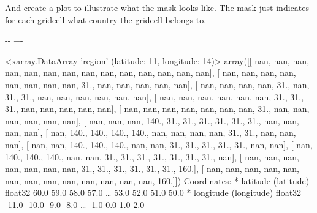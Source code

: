\documentclass[letterpaper,10pt,english]{sphinxmanual}
\newlength\nbsphinxcodecellspacing
\begin{document}
And create a plot to illustrate what the mask looks like. The mask just indicates for each gridcell what country the gridcell belongs to.

{
\begin{sphinxVerbatim}[commandchars=\\\{\}]
\llap{\color{nbsphinxin}[64]:\,\hspace{\fboxrule}\hspace{\fboxsep}}
\end{sphinxVerbatim}
}

{

\kern-\sphinxverbatimsmallskipamount\kern-\baselineskip
\kern+\FrameHeightAdjust\kern-\fboxrule
\vspace{\nbsphinxcodecellspacing}

\begin{sphinxVerbatim}[commandchars=\\\{\}]
\llap{\color{nbsphinxout}[64]:\,\hspace{\fboxrule}\hspace{\fboxsep}}<xarray.DataArray 'region' (latitude: 11, longitude: 14)>
array([[ nan,  nan,  nan,  nan,  nan,  nan,  nan,  nan,  nan,  nan,  nan,
         nan,  nan,  nan],
       [ nan,  nan,  nan,  nan,  nan,  nan,  nan,  nan,  31.,  nan,  nan,
         nan,  nan,  nan],
       [ nan,  nan,  nan,  nan,  31.,  nan,  31.,  31.,  nan,  nan,  nan,
         nan,  nan,  nan],
       [ nan,  nan,  nan,  nan,  nan,  nan,  31.,  31.,  31.,  nan,  nan,
         nan,  nan,  nan],
       [ nan,  nan,  nan,  nan,  nan,  nan,  nan,  31.,  nan,  nan,  nan,
         nan,  nan,  nan],
       [ nan,  nan,  nan, 140.,  31.,  31.,  31.,  31.,  31.,  31.,  nan,
         nan,  nan,  nan],
       [ nan, 140., 140., 140., 140.,  nan,  nan,  nan,  nan,  31.,  31.,
         nan,  nan,  nan],
       [ nan,  nan, 140., 140., 140.,  nan,  nan,  31.,  31.,  31.,  31.,
         31.,  nan,  nan],
       [ nan, 140., 140., 140.,  nan,  nan,  31.,  31.,  31.,  31.,  31.,
         31.,  31.,  nan],
       [ nan,  nan,  nan,  nan,  nan,  nan,  nan,  31.,  31.,  31.,  31.,
         31.,  31., 160.],
       [ nan,  nan,  nan,  nan,  nan,  nan,  nan,  nan,  nan,  nan,  nan,
         nan,  nan, 160.]])
Coordinates:
  * latitude   (latitude) float32 60.0 59.0 58.0 57.0 {\ldots} 53.0 52.0 51.0 50.0
  * longitude  (longitude) float32 -11.0 -10.0 -9.0 -8.0 {\ldots} -1.0 0.0 1.0 2.0
\end{sphinxVerbatim}
}
\end{document}
